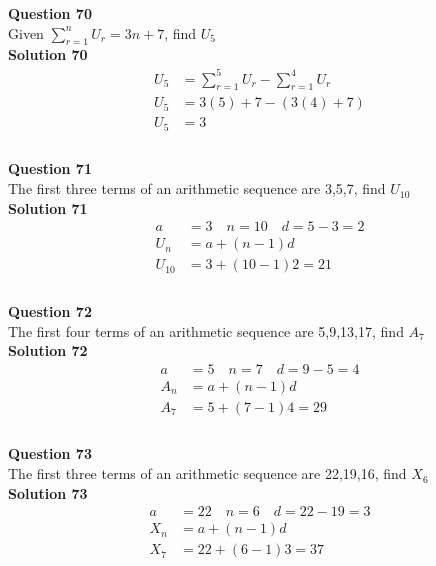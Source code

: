 \documentclass{article}
\begin{document}
\noindent\textbf{Question 70}\\[5pt]
Given $\displaystyle\sum_{r=1}^{n} U_r = 3n+7$, find $U_5$\\[5pt]
\noindent\textbf{Solution 70}\\[5pt]
\begin{align*}
U_5&=\displaystyle\sum_{r=1}^{5} U_r - \displaystyle\sum_{r=1}^{4} U_r\\[2pt]
U_5&=3(5)+7 - (3(4)+7)\\[2pt]
U_5&=3\\
\end{align*}\\[10pt]

\noindent\textbf{Question 71}\\[5pt]
The first three terms of an arithmetic sequence are 3,5,7, find $U_{10}$\\[5pt]
\noindent\textbf{Solution 71}\\[5pt]
\begin{align*}
a&=3\quad n=10 \quad d=5-3=2\\[2pt]
U_n&=a+(n-1)d\\[12pt]
U_{10}&=3+(10-1)2=21\\[2pt]
\end{align*}\\[10pt]

\noindent\textbf{Question 72}\\[5pt]
The first four terms of an arithmetic sequence are 5,9,13,17, find $A_7$\\[5pt]
\noindent\textbf{Solution 72}\\[5pt]
\begin{align*}
a&=5 \quad n=7 \quad d=9-5=4\\[2pt]
A_n&=a+(n-1)d\\[2pt]
A_7&=5+(7-1)4=29\\[2pt]
\end{align*}\\[10pt]

\noindent\textbf{Question 73}\\[5pt]
The first three terms of an arithmetic sequence are 22,19,16, find $X_6$\\[5pt]
\noindent\textbf{Solution 73}\\[5pt]
\begin{align*}
a&=22 \quad n=6 \quad d=22-19=3\\[2pt]
X_n&=a+(n-1)d\\[2pt]
X_7&=22+(6-1)3=37
\end{align*}\\[10pt]
\end{document}
